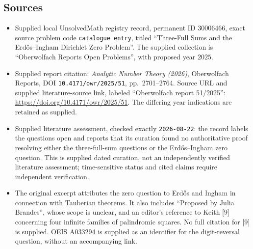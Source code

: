 \documentclass[11pt]{article}
\begin{document}
\subsection{Sources}
\begin{itemize}
\item Supplied local UnsolvedMath registry record, permanent ID \(30006466\), exact source problem code \texttt{catalogue entry}, titled ``Three-Full Sums and the Erd\H{o}s--Ingham Dirichlet Zero Problem''. The supplied collection is ``Oberwolfach Reports Open Problems'', with proposed year \(2025\).
\item Supplied report citation: \emph{Analytic Number Theory (2026)}, Oberwolfach Reports, DOI \texttt{10.4171/owr/2025/51}, pp.\ 2701--2764. Source URL and supplied literature-source link, labeled ``Oberwolfach report 51/2025'': \url{https://doi.org/10.4171/owr/2025/51}. The differing year indications are retained as supplied.
\item Supplied literature assessment, checked exactly \texttt{2026-08-22}: the record labels the questions open and reports that its curation found no authoritative proof resolving either the three-full-sum questions or the Erd\H{o}s--Ingham zero question. This is supplied dated curation, not an independently verified literature assessment; time-sensitive status and cited claims require independent verification.
\item The original excerpt attributes the zero question to Erd\H{o}s and Ingham in connection with Tauberian theorems. It also includes ``Proposed by Julia Brandes'', whose scope is unclear, and an editor's reference to Keith [9] concerning four infinite families of palindromic squares. No full citation for [9] is supplied. OEIS A033294 is supplied as an identifier for the digit-reversal question, without an accompanying link.
\end{itemize}
\end{document}
